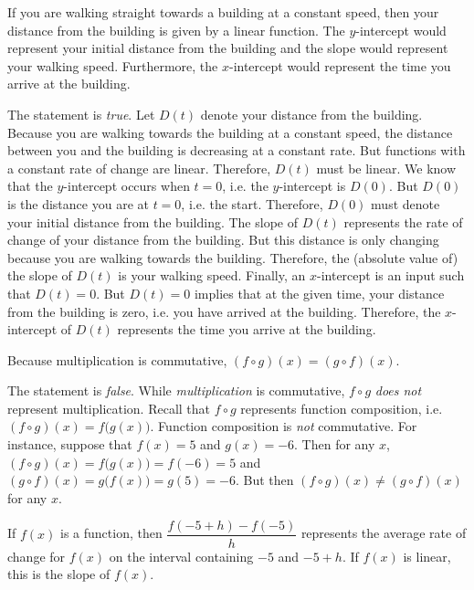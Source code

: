 \documentclass[11pt,letterpaper]{article}
\begin{document}
 If you are walking straight towards a building at a constant speed, then your distance from the building is given by a linear function. The $y$-intercept would represent your initial distance from the building and the slope would represent your walking speed. Furthermore, the $x$-intercept would represent the time you arrive at the building. \pspace

\sol The statement is \textit{true}. Let $D(t)$ denote your distance from the building. Because you are walking towards the building at a constant speed, the distance between you and the building is decreasing at a constant rate. But functions with a constant rate of change are linear. Therefore, $D(t)$ must be linear. We know that the $y$-intercept occurs when $t= 0$, i.e. the $y$-intercept is $D(0)$. But $D(0)$ is the distance you are at $t= 0$, i.e. the start. Therefore, $D(0)$ must denote your initial distance from the building. The slope of $D(t)$ represents the rate of change of your distance from the building. But this distance is only changing because you are walking towards the building. Therefore, the (absolute value of) the slope of $D(t)$ is your walking speed. Finally, an $x$-intercept is an input such that $D(t)= 0$. But $D(t)= 0$ implies that at the given time, your distance from the building is zero, i.e. you have arrived at the building. Therefore, the $x$-intercept of $D(t)$ represents the time you arrive at the building. \pvspace{1.3cm}



 Because multiplication is commutative, $(f \circ g)(x)= (g \circ f)(x)$. \pspace

\sol The statement is \textit{false}. While \textit{multiplication} is commutative, $f \circ g$ \textit{does not} represent multiplication. Recall that $f \circ g$ represents function composition, i.e. $(f \circ g)(x)= f \big( g(x) \big)$. Function composition is \textit{not} commutative. For instance, suppose that $f(x)= 5$ and $g(x)= -6$. Then for any $x$, $(f \circ g)(x)= f \big( g(x) \big)= f(-6)= 5$ and $(g \circ f)(x)= g \big( f(x) \big)= g(5)= -6$. But then $(f \circ g)(x) \neq (g \circ f)(x)$ for any $x$. 



\newpage



 If $f(x)$ is a function, then $\dfrac{f(-5 + h) - f(-5)}{h}$ represents the average rate of change for $f(x)$ on the interval containing $-5$ and $-5 + h$. If $f(x)$ is linear, this is the slope of $f(x)$. \pspace
\end{document}
